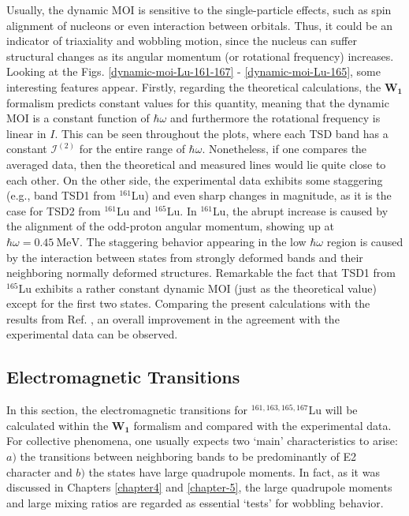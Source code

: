 Usually, the dynamic MOI is sensitive to the single-particle effects, such as spin alignment of nucleons or even interaction between orbitals. Thus, it could be an indicator of triaxiality and wobbling motion, since the nucleus can suffer structural changes as its angular momentum (or rotational frequency) increases. Looking at the Figs. \ref{dynamic-moi-Lu-161-167} - \ref{dynamic-moi-Lu-165}, some interesting features appear. Firstly, regarding the theoretical calculations, the $\mathbf{W_1}$ formalism predicts constant values for this quantity, meaning that the dynamic MOI is a constant function of $\hbar\omega$ and furthermore the rotational frequency is linear in $I$. This can be seen throughout the plots, where each TSD band has a constant $\mathcal{I}^{(2)}$ for the entire range of $\hbar\omega$. Nonetheless, if one compares the averaged data, then the theoretical and measured lines would lie quite close to each other. On the other side, the experimental data exhibits some staggering (e.g., band TSD1 from $^{161}$Lu) and even sharp changes in magnitude, as it is the case for TSD2 from $^{161}$Lu and $^{165}$Lu. In $^{161}$Lu, the abrupt increase is caused by the alignment of the odd-proton angular momentum, showing up at $\hbar\omega=0.45\ \text{MeV}$. The staggering behavior appearing in the low $\hbar\omega$ region is caused by the interaction between states from strongly deformed bands and their neighboring normally deformed structures. Remarkable the fact that TSD1 from $^{165}$Lu exhibits a rather constant dynamic MOI (just as the theoretical value) except for the first two states. Comparing the present calculations with the results from Ref. \cite{raduta2018wobbling}, an overall improvement in the agreement with the experimental data can be observed.

\subsection{Electromagnetic Transitions}

In this section, the electromagnetic transitions for $^{161,163,165,167}$Lu will be calculated within the $\mathbf{W_1}$ formalism and compared with the experimental data. For collective phenomena, one usually expects two `main' characteristics to arise: $a)$ the transitions between neighboring bands to be predominantly of E2 character and $b)$ the states have large quadrupole moments. In fact, as it was discussed in Chapters \ref{chapter4} and \ref{chapter-5}, the large quadrupole moments and large mixing ratios are regarded as essential `tests' for wobbling behavior.

